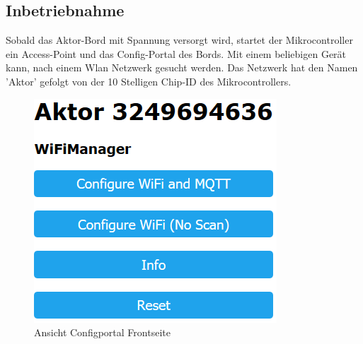 \subsection{Inbetriebnahme}
Sobald das Aktor-Bord mit Spannung versorgt wird, startet der Mikrocontroller ein Access-Point und das Config-Portal des Bords. Mit einem beliebigen Gerät kann, nach einem Wlan Netzwerk gesucht werden. Das Netzwerk hat den Namen 'Aktor' gefolgt von der 10 Stelligen Chip-ID des Mikrocontrollers. 
 
\begin{figure}[H]
	\begin{center}
	\begin{minipage}[b]{.3\linewidth} %
		\includegraphics[width=\textwidth]{graphics/Configportal.PNG}
		\caption{Ansicht Configportal Frontseite}
	\end{minipage}
	\hspace{.1\linewidth}%
	\begin{minipage}[b]{.3\linewidth} %

\end{minipage}
\end{center}
\end{figure}
